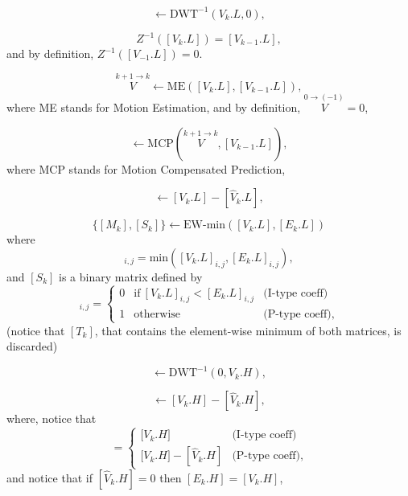 \begin{equation}
  [V_k.L] \leftarrow \text{DWT}^{-1}(V_k.L, 0),
  \tag{b}
\end{equation}

\begin{equation}
  Z^{-1}([V_k.L]) = [V_{k-1}.L],
  \tag{c}
\end{equation}
and by definition, $Z^{-1}([V_{-1}.L]) = 0$.

\begin{equation}
  \overset{k+1\rightarrow k}{V} \leftarrow \text{ME}([V_k.L], [V_{k-1}.L]),
  \tag{d}
\end{equation}
where ME stands for Motion Estimation, and by definition,
$\overset{0\rightarrow (-1)}{V}=0$,

\begin{equation}
  [\hat{V}_k.L] \leftarrow \text{MCP}(\overset{k+1\rightarrow k}{V}, [V_{k-1}.L]),
  \tag{e}
\end{equation}
where MCP stands for Motion Compensated Prediction,

\begin{equation}
  [E_k.L] \leftarrow [V_k.L] - [\hat{V}_k.L],
  \tag{f}
\end{equation}

\begin{equation}
  \{[M_k],[S_k]\} \leftarrow \text{EW-min}([V_k.L], [E_k.L])
  \tag{g}
\end{equation}
where
\begin{equation}
  [M_k]_{i,j}=\text{min}([V_k.L]_{i,j}, [E_k.L]_{i,j}),
\end{equation}
and $[S_k]$ is a binary matrix defined by
\begin{equation}
  [S_k]_{i,j} = \left\{
  \begin{array}{lll}
    0 & \text{if}~[V_k.L]_{i,j} < [E_k.L]_{i,j} & \text{(I-type coeff)} \\
    1 & \text{otherwise}                      & \text{(P-type coeff)},
  \end{array}
  \right.
  \label{eq:matrix}
\end{equation}
(notice that $[T_k]$, that contains the element-wise minimum of both
matrices, is discarded)

\begin{equation}
  [V_k.H] \leftarrow \text{DWT}^{-1}(0, V_k.H),
  \tag{h}
\end{equation}

\begin{equation}
  [E_k.H] \leftarrow [V_k.H] - [\hat{V}_k.H],
  \tag{i}
\end{equation}
where, notice that
\begin{equation}
  [E_k.H] = \left\{
  \begin{array}{ll}
    {[}V_k.H{]}                 & \text{(I-type coeff)}\\
    {[}V_k.H{]} - [\hat{V}_k.H] & \text{(P-type coeff)},
  \end{array}
  \right.
\end{equation}
and notice that if $[\hat{V}_k.H]=0$ then $[E_k.H] = [V_k.H]$,


